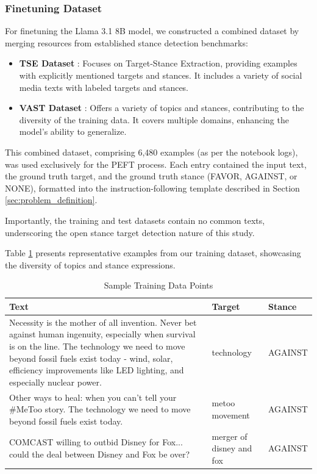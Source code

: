 \documentclass[twocolumn,11pt,letterpaper]{article}
\begin{document}
\subsubsection{Finetuning Dataset}
For finetuning the Llama 3.1 8B model, we constructed a combined dataset by merging resources from established stance detection benchmarks:
\begin{itemize}
    \item \textbf{TSE Dataset} \cite{tse_data}: Focuses on Target-Stance Extraction, providing examples with explicitly mentioned targets and stances. It includes a variety of social media texts with labeled targets and stances.
    \item \textbf{VAST Dataset} \cite{vast_data}: Offers a variety of topics and stances, contributing to the diversity of the training data. It covers multiple domains, enhancing the model's ability to generalize.
\end{itemize}
This combined dataset, comprising 6,480 examples (as per the notebook logs), was used exclusively for the PEFT process. Each entry contained the input text, the ground truth target, and the ground truth stance (FAVOR, AGAINST, or NONE), formatted into the instruction-following template described in Section \ref{sec:problem_definition}.

Importantly, the training and test datasets contain no common texts, underscoring the open stance target detection nature of this study.

Table \ref{tab:training_samples} presents representative examples from our training dataset, showcasing the diversity of topics and stance expressions.

\begin{table}[!htbp]
\centering
\caption{Sample Training Data Points}
\label{tab:training_samples}
\begin{tabular}{|p{}|p{}|p{}|}
\hline
\textbf{Text} & \textbf{Target} & \textbf{Stance} \\
\hline
Necessity is the mother of all invention. Never bet against human ingenuity, especially when survival is on the line. The technology we need to move beyond fossil fuels exist today - wind, solar, efficiency improvements like LED lighting, and especially nuclear power. & technology & AGAINST \\
\hline
Other ways to heal: when you can't tell your \#MeToo story. The technology we need to move beyond fossil fuels exist today. & metoo movement & AGAINST \\
\hline
COMCAST willing to outbid Disney for Fox... could the deal between Disney and Fox be over? & merger of disney and fox & AGAINST \\
\hline
\end{tabular}
\end{table}
\end{document}
